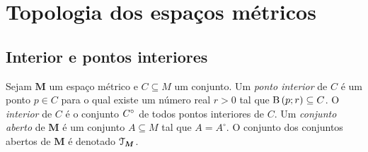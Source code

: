 \section{Topologia dos espaços métricos}

\subsection{Interior e pontos interiores}

\begin{definition}
Sejam $\bm M$ um espaço métrico e $C \subseteq M$ um conjunto. Um \emph{ponto interior} de $C$ é um ponto $p \in C$ para o qual existe um número real $r > 0$ tal que $\mathrm{B}\left(p; r\right) \subseteq C$. O \emph{interior} de $C$ é o conjunto ${C}^\circ$ de todos pontos interiores de $C$. Um \emph{conjunto aberto} de $\bm M$ é um conjunto $A \subseteq M$ tal que $A = A^\circ$. O conjunto dos conjuntos abertos de $\bm M$ é denotado $\mathcal{T}_{\bm M}$.
\end{definition}

